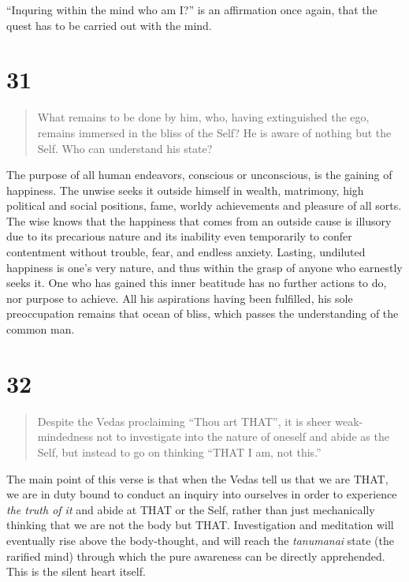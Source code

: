 \documentclass[12pt]{report}
\begin{document}
``Inquring within the mind who am I?'' is an affirmation once again,
that the quest has to be carried out with the mind.

\section{31}

\begin{quote}
  What remains to be done by him, who, having extinguished the ego,
  remains immersed in the bliss of the Self? He is aware of nothing
  but the Self. Who can understand his state?
\end{quote}


The purpose of all human endeavors, conscious or unconscious, is the
gaining of happiness. The unwise seeks it outside himself in wealth,
matrimony, high political and social positions, fame, worldy
achievements and pleasure of all sorts. The wise knows that the
happiness that comes from an outside cause is illusory due to its
precarious nature and its inability even temporarily to confer
contentment without trouble, fear, and endless anxiety. Lasting,
undiluted happiness is one's very nature, and thus within the grasp of
anyone who earnestly seeks it. One who has gained this inner beatitude
has no further actions to do, nor purpose to achieve. All his
aspirations having been fulfilled, his sole preoccupation remains that
ocean of bliss, which passes the understanding of the common man.

\section{32}

\begin{quote}
  Despite the Vedas proclaiming ``Thou art THAT'', it is sheer
  weak-mindedness not to investigate into the nature of oneself and
  abide as the Self, but instead to go on thinking ``THAT I am, not
  this.'' 
\end{quote}


The main point of this verse is that when the Vedas tell us that we
are THAT, we are in duty bound to conduct an inquiry into ourselves in
order to experience \emph{the truth of it} and abide at THAT or the
Self, rather than just mechanically thinking that we are not the body
but THAT. Investigation and meditation will eventually rise above the
body-thought, and will reach the \emph{tanumanai} state (the rarified
mind) through which the pure awareness can be directly
apprehended. This is the silent heart itself.
\end{document}
